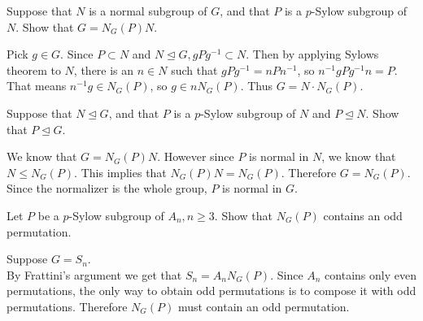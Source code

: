 \documentclass[12pt, answers]{exam}
\begin{document}
\begin{questions}
        \question Suppose that $N$ is a normal subgroup of $G$, and that $P$ is a $p$-Sylow subgroup of $N$.
        Show that $G = N_G(P)N.$
        \begin{solution}
            Pick $g \in G$. Since $P \subset N$ and $N \trianglelefteq G, gPg^{-1} \subset N$. Then by applying Sylows
            theorem to $N$, there is an $n \in N$ such that $gPg^{-1} = nPn^{-1}$, so $n^{-1}gPg^{-1}n = P$. That means
            $n^{-1}g \in N_G(P)$, so $g \in nN_G(P)$. Thus $G = N \cdot N_G(P)$.
        \end{solution}

        \question Suppose that $N \trianglelefteq G$, and that $P$ is a $p$-Sylow subgroup of $N$ and $P \trianglelefteq N$.
        Show that $P \trianglelefteq G$.
        \begin{solution}
            We know that $G = N_G(P)N$. However since $P$ is normal in $N$, we know that $N \leq N_G(P)$. This implies that
            $N_G(P)N = N_G(P)$. Therefore $G = N_G(P)$. Since the normalizer is the whole group, $P$ is normal in $G$.
        \end{solution}
        \pagebreak
        \question Let $P$ be a $p$-Sylow subgroup of $A_n, n\geq 3$. Show that $N_G(P)$ contains an odd permutation.
        \begin{solution}
            Suppose $G = S_n$. \\
            By Frattini's argument we get that $S_n = A_nN_G(P)$. Since $A_n$ contains only even permutations, the only
            way to obtain odd permutations is to compose it with odd permutations. Therefore $N_G(P)$ must contain an odd
            permutation.
        \end{solution}
    \end{questions}
\end{document}
